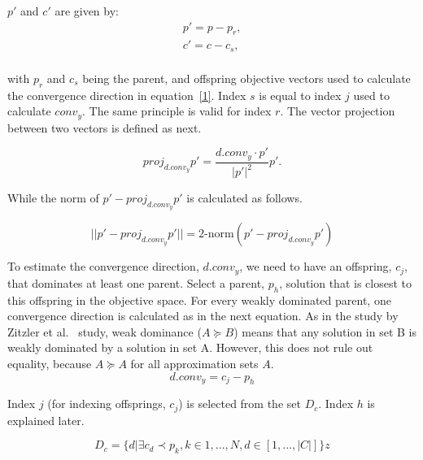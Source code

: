 $p\prime$ and $c\prime $ are given by:
\vspace{-1em}
\begin{equation}
\begin{split}
p\prime = p - p_r,\\
c\prime = c - c_s,\\
\end{split}
\end{equation}

with $p_r$ and $c_s$ being the parent, and offspring objective vectors used to calculate the convergence direction in equation~\ref{1}. Index $s$ is equal to index $j$ used to calculate $conv_{y}$. The same principle is valid for index $r$. The vector projection between two vectors is defined as next.

\begin{equation}
proj_{d.conv_{y}}p \prime = \frac {{d.conv_{y}} \cdot {p \prime}} {|{p \prime}|^2}{{p \prime}}.
\end{equation}

While the norm of $p \prime - proj_{d.conv_{y}}p \prime$ is calculated as follows.

\begin{equation}
||p \prime - proj_{d.conv_{y}}p \prime|| = \text{2-norm}(p \prime - proj_{d.conv_{y}}p \prime)
\end{equation}


To estimate the convergence direction, $d.conv_{y}$, we need to have an offspring, $c_j$, that dominates at least one parent. Select a parent, $p_h$, solution that is closest to this offspring in the objective space.  For every weakly dominated parent, one convergence direction is calculated as in the next equation. As in the study by Zitzler et al.~\cite{zitzler2003performance} study, weak dominance ($A \succeq B$) means that any solution in set B is weakly dominated by a solution in set A. However, this does not rule out equality, because $A \succeq A$ for all approximation sets $A$.
\begin{equation}
\label{1}
d.conv_{y} = c_j - p_h
\end{equation}

Index $j$ (for indexing offsprings, $c_j$) is selected from the set $D_c$. Index $h$ is explained later.

\vspace{-1em}
\begin{equation}
\label{D}
D_c = \{d| \exists c_d \prec p_k, k \in {1,..., N}, d \in [1,..., |C|]\}
z\end{equation}

